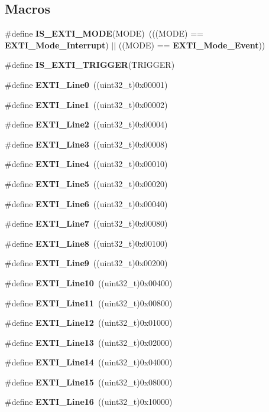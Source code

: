 \subsection*{Macros}
\begin{DoxyCompactItemize}
\item 
\#define \textbf{ I\+S\+\_\+\+E\+X\+T\+I\+\_\+\+M\+O\+DE}(M\+O\+DE)~(((M\+O\+DE) == \textbf{ E\+X\+T\+I\+\_\+\+Mode\+\_\+\+Interrupt}) $\vert$$\vert$ ((M\+O\+DE) == \textbf{ E\+X\+T\+I\+\_\+\+Mode\+\_\+\+Event}))
\item 
\#define \textbf{ I\+S\+\_\+\+E\+X\+T\+I\+\_\+\+T\+R\+I\+G\+G\+ER}(T\+R\+I\+G\+G\+ER)
\item 
\#define \textbf{ E\+X\+T\+I\+\_\+\+Line0}~((uint32\+\_\+t)0x00001)
\item 
\#define \textbf{ E\+X\+T\+I\+\_\+\+Line1}~((uint32\+\_\+t)0x00002)
\item 
\#define \textbf{ E\+X\+T\+I\+\_\+\+Line2}~((uint32\+\_\+t)0x00004)
\item 
\#define \textbf{ E\+X\+T\+I\+\_\+\+Line3}~((uint32\+\_\+t)0x00008)
\item 
\#define \textbf{ E\+X\+T\+I\+\_\+\+Line4}~((uint32\+\_\+t)0x00010)
\item 
\#define \textbf{ E\+X\+T\+I\+\_\+\+Line5}~((uint32\+\_\+t)0x00020)
\item 
\#define \textbf{ E\+X\+T\+I\+\_\+\+Line6}~((uint32\+\_\+t)0x00040)
\item 
\#define \textbf{ E\+X\+T\+I\+\_\+\+Line7}~((uint32\+\_\+t)0x00080)
\item 
\#define \textbf{ E\+X\+T\+I\+\_\+\+Line8}~((uint32\+\_\+t)0x00100)
\item 
\#define \textbf{ E\+X\+T\+I\+\_\+\+Line9}~((uint32\+\_\+t)0x00200)
\item 
\#define \textbf{ E\+X\+T\+I\+\_\+\+Line10}~((uint32\+\_\+t)0x00400)
\item 
\#define \textbf{ E\+X\+T\+I\+\_\+\+Line11}~((uint32\+\_\+t)0x00800)
\item 
\#define \textbf{ E\+X\+T\+I\+\_\+\+Line12}~((uint32\+\_\+t)0x01000)
\item 
\#define \textbf{ E\+X\+T\+I\+\_\+\+Line13}~((uint32\+\_\+t)0x02000)
\item 
\#define \textbf{ E\+X\+T\+I\+\_\+\+Line14}~((uint32\+\_\+t)0x04000)
\item 
\#define \textbf{ E\+X\+T\+I\+\_\+\+Line15}~((uint32\+\_\+t)0x08000)
\item 
\#define \textbf{ E\+X\+T\+I\+\_\+\+Line16}~((uint32\+\_\+t)0x10000)
$$
\end{DoxyCompactItemize}
